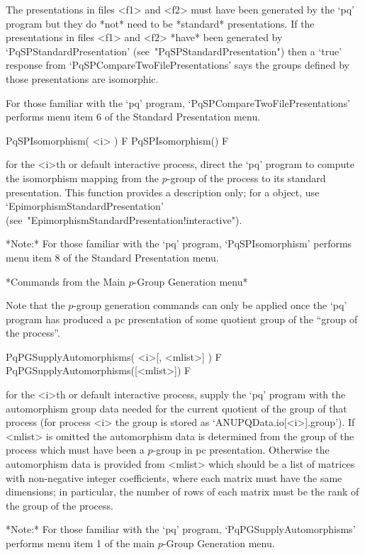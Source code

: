 The presentations in files <f1> and <f2> must have been generated by  the
`pq' program but they do *not* need to be *standard* presentations. If the
presentations  in  files  <f1>  and   <f2>  *have*  been   generated   by
`PqSPStandardPresentation' (see~"PqSPStandardPresentation") then a `true'
response from `PqSPCompareTwoFilePresentations' says the  groups  defined
by those presentations are isomorphic.

For      those      familiar      with       the       `pq'       program,
`PqSPCompareTwoFilePresentations' performs menu item 6  of  the  Standard
Presentation menu.

\>PqSPIsomorphism( <i> ) F
\>PqSPIsomorphism() F

for the <i>th or default interactive {\ANUPQ} process,  direct  the  `pq'
program to compute the isomorphism mapping  from  the  $p$-group  of  the
process  to  its  standard  presentation.  This   function   provides   a
description      only;      for      a      {\GAP}      object,       use
`EpimorphismStandardPresentation'
(see~"EpimorphismStandardPresentation!interactive").

*Note:* For  those  familiar  with  the  `pq'  program,  `PqSPIsomorphism'
performs menu item 8 of the Standard Presentation menu.

*Commands from the Main $p$-Group Generation menu*

Note that the $p$-group generation commands can only be applied once  the
`pq' program has produced a pc presentation of some quotient group of the
``group of the process''.

\>PqPGSupplyAutomorphisms( <i>[, <mlist>] ) F
\>PqPGSupplyAutomorphisms([<mlist>]) F

for the <i>th or default interactive {\ANUPQ} process,  supply  the  `pq'
program with the automorphism group data needed for the  current  quotient
of the group of that process (for process <i>  the  group  is  stored  as
`ANUPQData.io[<i>].group'). If <mlist> is omitted the  automorphism  data
is determined from the group of  the  process  which  must  have  been  a
$p$-group in pc presentation. Otherwise the automorphism data is provided
from <mlist> which should be a list of matrices with non-negative integer
coefficients, where  each  matrix  must  have  the  same  dimensions;  in
particular, the number of rows of each matrix must be  the  rank  of  the
group of the process.

*Note:*
For  those  familiar  with  the  `pq'  program,  `PqPGSupplyAutomorphisms'
performs menu item 1 of the main $p$-Group Generation menu.

